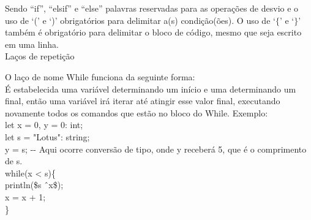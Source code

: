 \documentclass[12pt,a4paper]{article}
\begin{document}
Sendo ``if'', ``elsif'' e ``else'' palavras reservadas para as operações de desvio e o uso de `(' e `)' obrigatórios para delimitar a(s) condição(ões). O uso de `$\{$' e `$\}$' também é obrigatório para delimitar o bloco de código, mesmo que seja escrito em uma linha.\\


\hypertarget{label5}{\Large{Laços de repetição}}\\[0.3cm]
\normalsize

O laço de nome While funciona da seguinte forma: \\

É estabelecida uma variável determinando um início e uma determinando um final, então uma variável irá iterar até atingir esse valor final, executando novamente todos os comandos que estão no bloco do While. Exemplo: \\

let x = 0, y = 0: int;\\

let s = "Lotus": string;\\

y = s; -{}- Aqui ocorre conversão de tipo, onde y receberá 5, que é o comprimento de s. \\[0.2cm]
while(x < s)\{\\
\indent println(\$s \^\ x\$);\\
\indent x = x + 1;\\
\}\\
\end{document}
